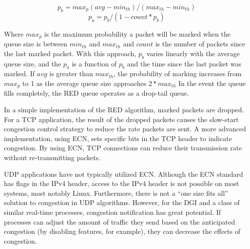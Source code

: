 \begin{equation}
p_{b} = max_p (avg - min_{th}) / (max_{th}-min_{th})
\end{equation}
\begin{equation}
p_{a} = p_{b} / (1-count * p_b)
\end{equation}

Where $max_p$ is the maximum probability a packet will be marked when the queue size is between $min_{th}$ and $max_{th}$ and $count$ is the number of packets since the last marked packet.
With this approach, $p_{b}$ varies linearly with the average queue size, and the $p_{a}$ is a function of $p_{b}$ and the time since the last packet was marked.
If $avg$ is greater than $max_{th}$, the probability of marking increases from $max_p$ to 1 as the average queue size approaches $2*max_{th}$
In the event the queue fills completely, the \ac{RED} queue operates as a drop-tail queue.

In a simple implementation of the \ac{RED} algorithm, marked packets are dropped.
For a TCP application, the result of the dropped packets causes the slow-start congestion control strategy to reduce the rate packets are sent.
A more advanced implementation, using \ac{ECN}, sets specific bits in the TCP header to indicate congestion.
By using \ac{ECN}, TCP connections can reduce their transmission rate without re-transmitting packets.

UDP applications have not typically utilized \ac{ECN}.
Although the \ac{ECN} standard has flags in the IPv4 header, access to the IPv4 header is not possible on most systems, most notably Linux.
Furthermore, there is not a ``one size fits all'' solution to congestion in UDP algorithms.
However, for the \ac{DGI} and a class of similar real-time processes, congestion notification has great potential.
If processes can adjust the amount of traffic they send based on the anticipated congestion (by disabling features, for example), they can decrease the effects of congestion.

